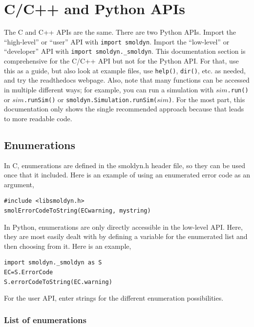 \documentclass {scrbook}
\newcommand {\ttt} {\texttt}
\begin{document}
\chapter{C/C++ and Python APIs}
\label{ch:APIReference}

The C and C++ APIs are the same. There are two Python APIs. Import the ``high-level'' or ``user'' API with \ttt{import smoldyn}. Import the ``low-level'' or ``developer'' API with \ttt{import smoldyn.\_smoldyn}. This documentation section is comprehensive for the C/C++ API but not for the Python API. For that, use this as a guide, but also look at example files, use \ttt{help()}, \ttt{dir()}, etc. as needed, and try the readthedocs webpage. Also, note that many functions can be accessed in multiple different ways; for example, you can run a simulation with $sim$\ttt{.run()} or $sim$\ttt{.runSim()} or \ttt{smoldyn.Simulation.runSim($sim$)}. For the most part, this documentation only shows the single recommended approach because that leads to more readable code.

\section{Enumerations}

In C, enumerations are defined in the smoldyn.h header file, so they can be used once that it included. Here is an example of using an enumerated error code as an argument,
\begin{lstlisting}[style=SSAC]
#include <libsmoldyn.h>
smolErrorCodeToString(ECwarning, mystring)
\end{lstlisting}

In Python, enumerations are only directly accessible in the low-level API. Here, they are most easily dealt with by defining a variable for the enumerated list and then choosing from it. Here is an example,
\begin{lstlisting}[style=SSAC]
import smoldyn._smoldyn as S
EC=S.ErrorCode
S.errorCodeToString(EC.warning)
\end{lstlisting}
For the user API, enter strings for the different enumeration possibilities.

\subsection*{List of enumerations}
\end{document}
